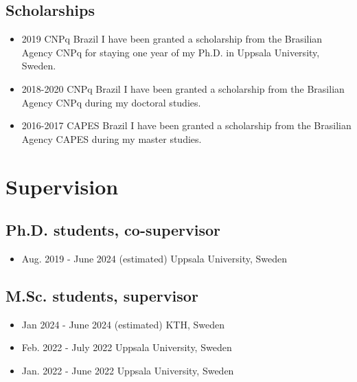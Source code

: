 \documentclass[10pt,A4]{article} %
\begin{document}
\subsection{Scholarships}
 \begin{itemize}
    \item   {}
    { 2019 }
    { CNPq }
    { Brazil }
    { I have been granted a scholarship from the Brasilian Agency CNPq for staying one year of my Ph.D. in Uppsala University, Sweden. }
    \item {}
    { 2018-2020 }
    { CNPq }
    { Brazil }
    { I have been granted a scholarship from the Brasilian Agency CNPq during my doctoral studies. }
    \item {}
    { 2016-2017 }
    { CAPES }
    { Brazil }
    { I have been granted a scholarship from the Brasilian Agency CAPES during my master studies. }

  \end{itemize}


\section{Supervision}


  \subsection{\noindent Ph.D.  students, co-supervisor  }
  \begin{itemize}
    
        \item {}
        { Aug. 2019 - June 2024 (estimated) }
        { Uppsala University, Sweden }
        {  }
     
  \end{itemize}

  \subsection{\noindent M.Sc.  students, supervisor  }
  \begin{itemize}
    
        \item {}
        { Jan 2024 - June 2024 (estimated) }
        { KTH, Sweden }
        {  }
     
        \item {}
        { Feb. 2022 - July 2022 }
        { Uppsala University, Sweden }
        {  }
     
        \item {}
        { Jan. 2022 - June 2022 }
        { Uppsala University, Sweden }
        {  }
     
  \end{itemize}
\end{document}
